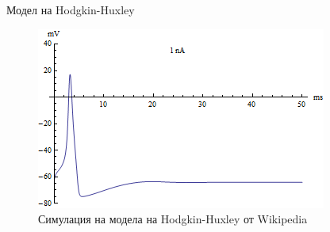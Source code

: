 \begin{frame}[t]{Модел на Hodgkin-Huxley}
  \begin{figure}[htbp!]
      \centering
      \includegraphics[width=\textwidth,height=0.7\textheight,keepaspectratio]{hodgkin-huxley-graph/54223cdddc0944ffde281cbf29a5bf157wMigNej1EKKnEa6-6.png}
      \caption{Симулация на модела на Hodgkin-Huxley от Wikipedia}
  \end{figure}
\end{frame}